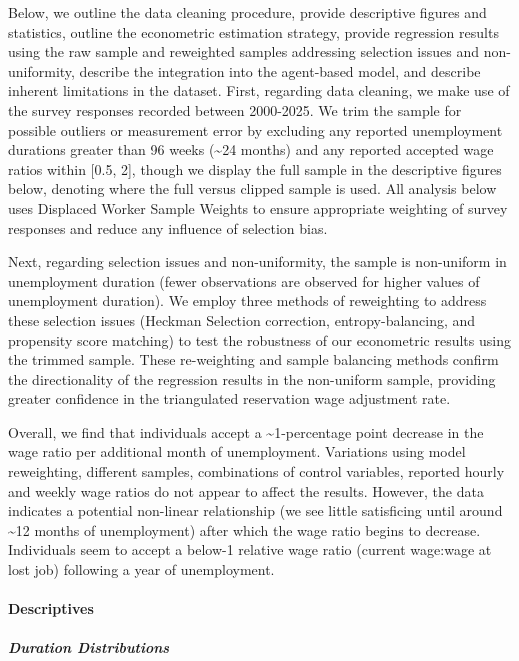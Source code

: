\documentclass[
]{article}
\begin{document}
Below, we outline the data cleaning procedure, provide descriptive
figures and statistics, outline the econometric estimation strategy,
provide regression results using the raw sample and reweighted samples
addressing selection issues and non-uniformity, describe the integration
into the agent-based model, and describe inherent limitations in the
dataset. First, regarding data cleaning, we make use of the survey
responses recorded between 2000-2025. We trim the sample for possible
outliers or measurement error by excluding any reported unemployment
durations greater than 96 weeks (\textasciitilde24 months) and any
reported accepted wage ratios within {[}0.5, 2{]}, though we display the
full sample in the descriptive figures below, denoting where the full
versus clipped sample is used. All analysis below uses Displaced Worker
Sample Weights to ensure appropriate weighting of survey responses and
reduce any influence of selection bias.

Next, regarding selection issues and non-uniformity, the sample is
non-uniform in unemployment duration (fewer observations are observed
for higher values of unemployment duration). We employ three methods of
reweighting to address these selection issues (Heckman Selection
correction, entropy-balancing, and propensity score matching) to test
the robustness of our econometric results using the trimmed sample.
These re-weighting and sample balancing methods confirm the
directionality of the regression results in the non-uniform sample,
providing greater confidence in the triangulated reservation wage
adjustment rate.

Overall, we find that individuals accept a \textasciitilde1-percentage
point decrease in the wage ratio per additional month of unemployment.
Variations using model reweighting, different samples, combinations of
control variables, reported hourly and weekly wage ratios do not appear
to affect the results. However, the data indicates a potential
non-linear relationship (we see little satisficing until around
\textasciitilde12 months of unemployment) after which the wage ratio
begins to decrease. Individuals seem to accept a below-1 relative wage
ratio (current wage:wage at lost job) following a year of unemployment.

\paragraph{Descriptives}\label{descriptives}

\subparagraph{Duration Distributions}\label{duration-distributions}
\end{document}
